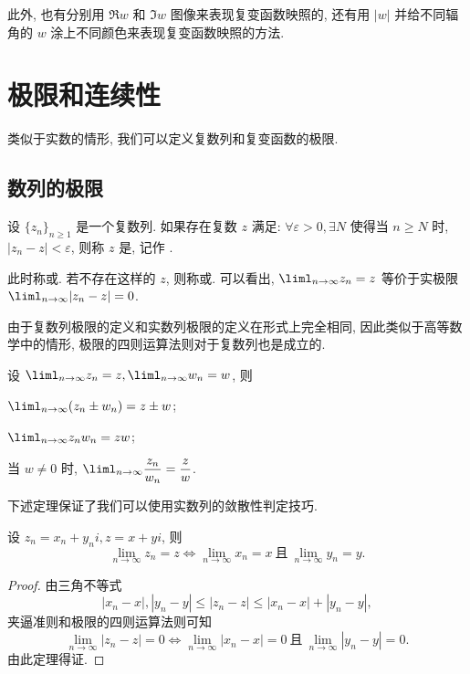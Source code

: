 此外, 也有分别用 $\Re w$ 和 $\Im w$ 图像来表现复变函数映照的, 还有用 $|w|$ 并给不同辐角的 $w$ 涂上不同颜色来表现复变函数映照的方法.

\section{极限和连续性}

类似于实数的情形, 我们可以定义复数列和复变函数的极限.

\subsection{数列的极限}

\begin{definition}
  设 $\{z_n\}_{n\ge 1}$ 是一个复数列.
  如果存在复数 $z$ 满足: $\forall \varepsilon>0,\exists N$ 使得当 $n\ge N$ 时, $|z_n-z|<\varepsilon$, 则称 $z$ 是, 记作 .
\end{definition}
此时称或.
若不存在这样的 $z$, 则称或.
可以看出, $\liml_{n\to\infty}z_n=z$ 等价于实极限 $\liml_{n\to\infty}|z_n-z|=0$.

由于复数列极限的定义和实数列极限的定义在形式上完全相同, 因此类似于高等数学中的情形, 极限的四则运算法则对于复数列也是成立的.
\begin{theorem}
  设 $\liml_{n\to\infty}z_n=z,\liml_{n\to\infty}w_n=w$, 则
  \begin{enumpar}
    \item $\liml_{n\to\infty}(z_n\pm w_n)=z\pm w$;
    \item $\liml_{n\to\infty} z_nw_n=zw$;
    \item 当 $w\neq 0$ 时, $\liml_{n\to\infty}\dfrac{z_n}{w_n}=\dfrac zw$.
  \end{enumpar}
\end{theorem}

下述定理保证了我们可以使用实数列的敛散性判定技巧.
\begin{theorem}
  设 $z_n=x_n+y_ni,z=x+yi$, 则
  \[
    \lim_{n\to\infty}z_n=z\iff
    \lim_{n\to\infty}x_n=x\ \text{且}\ 
    \lim_{n\to\infty}y_n=y.
  \]
\end{theorem}

\begin{proof}
  由三角不等式
  \[
    |x_n-x|,|y_n-y|\le|z_n-z|\le|x_n-x|+|y_n-y|,
  \]
  夹逼准则和极限的四则运算法则可知
  \[
    \lim_{n\to\infty}|z_n-z|=0\iff
    \lim_{n\to\infty}|x_n-x|=0\ \text{且}\ 
    \lim_{n\to\infty}|y_n-y|=0.
  \]
  由此定理得证.
\end{proof}

